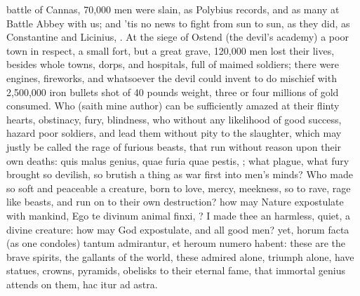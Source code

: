 {battle of Cannas, 70,000 men were slain, as Polybius records, and
as many at Battle Abbey with us; and 'tis no news to fight from sun to
sun, as they did, as Constantine and Licinius, \etc{}. At the siege of
Ostend (the devil's academy) a poor town in respect, a small fort, but
a great grave, 120,000 men lost their lives, besides whole towns,
dorps, and hospitals, full of maimed soldiers; there were engines,
fireworks, and whatsoever the devil could invent to do mischief with
2,500,000 iron bullets shot of 40 pounds weight, three or four millions
of gold consumed. Who (saith mine author) can be sufficiently
amazed at their flinty hearts, obstinacy, fury, blindness, who without
any likelihood of good success, hazard poor soldiers, and lead them
without pity to the slaughter, which may justly be called the rage of
furious beasts, that run without reason upon their own deaths:
quis malus genius, quae furia quae pestis, \etc{}; what plague, what
fury brought so devilish, so brutish a thing as war first into men's
minds? Who made so soft and peaceable a creature, born to love, mercy,
meekness, so to rave, rage like beasts, and run on to their own
destruction? how may Nature expostulate with mankind, Ego te divinum
animal finxi, \etc{}? I made thee an harmless, quiet, a divine creature:
how may God expostulate, and all good men? yet, horum facta (as
one condoles) tantum admirantur, et heroum numero habent: these
are the brave spirits, the gallants of the world, these admired alone,
triumph alone, have statues, crowns, pyramids, obelisks to their
eternal fame, that immortal genius attends on them, hac itur ad astra.

}
